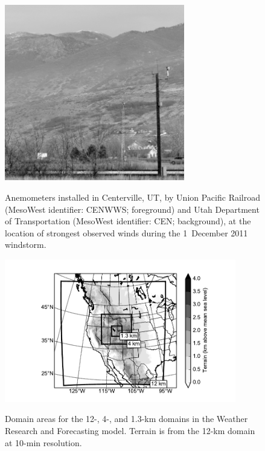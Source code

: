 \documentclass[pdftex,12pt]{article}
\def\MW{\mbox{MesoWest}} %
\begin{document}
\begin{figure}[t]
\centering
\noindent\includegraphics[width=0.7\textwidth]{cen_cenwws_small_crop_BW}\\
\caption{Anemometers installed in Centerville, UT, by Union Pacific Railroad (\MW{} identifier: CENWWS; foreground) and Utah Department of Transportation (\MW{} identifier: CEN; background), at the location of strongest observed winds during the 1~December 2011 windstorm.}
\label{fig:cenwws}
\end{figure}

\begin{figure}[t]
\centering
\includegraphics[width=0.9\textwidth,angle=0]{domains.pdf}\\
\caption{Domain areas for the 12-, 4-, and 1.3-km domains in the Weather Research and Forecasting model. Terrain is from the 12-km domain at 10-min resolution.}
\label{fig:domains}
\end{figure}
\end{document}
